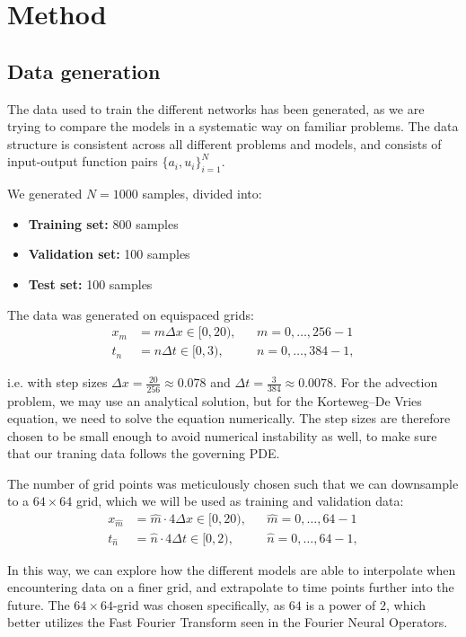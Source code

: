 \chapter{Method}

\section{Data generation}
The data used to train the different networks has been generated, as we are trying to compare the models in a systematic way on familiar problems.
The data structure is consistent across all different problems and models, and consists of input-output function pairs \(\{a_i, u_i\}_{i=1}^N\).

We generated \(N = 1000\) samples, divided into:
\begin{itemize}
    \item \textbf{Training set:} 800 samples
    \item \textbf{Validation set:} 100 samples
    \item \textbf{Test set:} 100 samples
\end{itemize}

The data was generated on equispaced grids:
\begin{align*}
    x_m &= m \Delta x \in [0, 20), &&m = 0, \dots, 256-1\\
    t_n &= n \Delta t \in [0, 3), &&n = 0, \dots, 384-1,
\end{align*}

i.e. with step sizes \(\Delta x = \frac{20}{256} \approx 0.078\) and \(\Delta t = \frac{3}{384} \approx 0.0078\). For the advection problem, we may use an analytical solution, but for the Korteweg–De Vries equation, we need to solve the equation numerically.
The step sizes are therefore chosen to be small enough to avoid numerical instability as well, to make sure that our traning data follows the governing PDE.

The number of grid points was meticulously chosen such that we can downsample to a \(64 \times 64\) grid, which we will be used as training and validation data:
\begin{align*}
    x_{\hat{m}} &= \hat{m}\cdot 4 \Delta x \in [0, 20), &&\hat{m} = 0, \dots, 64-1\\
    t_{\hat{n}} &= \hat{n} \cdot 4 \Delta t \in [0, 2), &&\hat{n} = 0, \dots, 64-1,
\end{align*}

In this way, we can explore how the different models are able to interpolate when encountering data on a finer grid, and 
extrapolate to time points further into the future.
The \(64 \times 64\)-grid was chosen specifically, as \(64\) is a power of \(2\), which better utilizes the Fast Fourier Transform seen in the Fourier Neural Operators.

